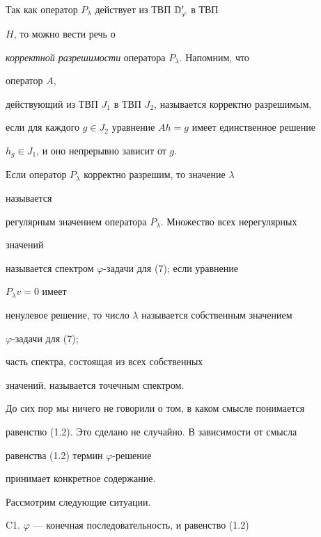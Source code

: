  


Так как оператор $P_\lambda$ действует из ТВП $\Bbb D'_\varphi$ в ТВП 


$H$, то можно вести речь о 


{\it корректной разрешимости} оператора $P_\lambda$. Напомним, что 


оператор $A$, 


действующий из ТВП $J_1$ в ТВП $J_2$, называется корректно разрешимым, 


если для каждого $g\in J_2$ уравнение $Ah=g$ имеет единственное решение 


$h_g\in J_1$, и оно непрерывно зависит от $g$. 


 


\begin{defns} 


Если оператор $P_\lambda$ корректно разрешим, то значение $\lambda$ 


называется 


регулярным значением оператора $P_\lambda$. Множество всех нерегулярных 


значений 


называется спектром $\varphi$-задачи для (7); если уравнение 


$P_\lambda v=0$ имеет 


ненулевое решение, то число $\lambda$ называется собственным значением 


$\varphi$-задачи для (7);


часть спектра, состоящая из всех собственных 


значений, называется точечным спектром. 


\end{defns} 


 


До сих пор мы ничего не говорили о том, в каком смысле понимается 


равенство (1.2). Это сделано не случайно. В зависимости от смысла 


равенства (1.2) термин $\varphi$-решение 


принимает конкретное содержание. 


Рассмотрим следующие ситуации. 


\medskip 


 


C1. $\varphi$ --- конечная последовательность, и равенство (1.2) 


